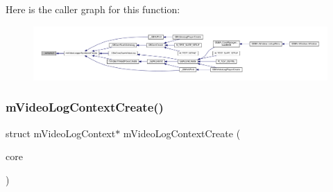 Here is the caller graph for this function\+:
\nopagebreak
\begin{figure}[H]
\begin{center}
\leavevmode
\includegraphics[width=350pt]{video-logger_8c_a2bb793afc8d7e37b65be24d0c0198d13_icgraph}
\end{center}
\end{figure}
\mbox{\label{video-logger_8c_abfc652080406bf430af299f8ab419aec}} 
\subsubsection{\texorpdfstring{m\+Video\+Log\+Context\+Create()}{mVideoLogContextCreate()}}
{\footnotesize\ttfamily struct m\+Video\+Log\+Context$\ast$ m\+Video\+Log\+Context\+Create (\begin{DoxyParamCaption}\item[{struct m\+Core $\ast$}]{core }\end{DoxyParamCaption})}


